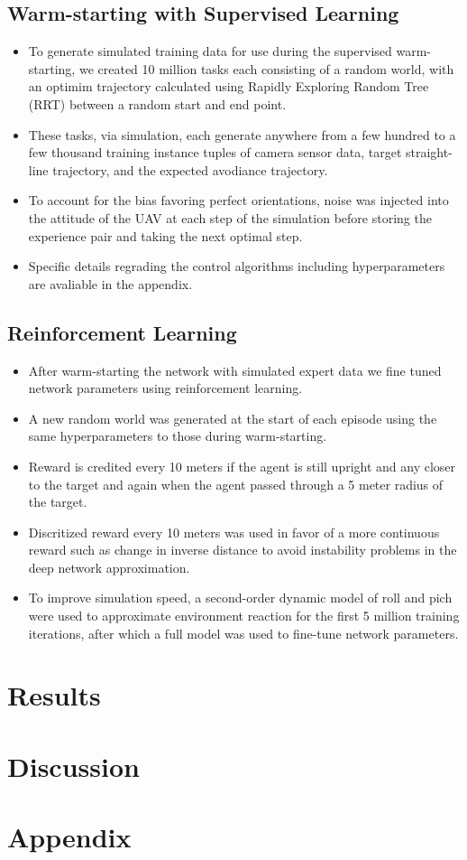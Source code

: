 \documentclass[paper=a4, fontsize=11pt]{scrartcl} %
\begin{document}
	\subsection{Warm-starting with Supervised Learning} 
	\begin{itemize}
		\item To generate simulated training data for use during the supervised warm-starting, we created 10 million tasks each consisting of a random world, with an optimim trajectory calculated using Rapidly Exploring Random Tree (RRT) between a random start and end point. 
		\item These tasks, via simulation, each generate anywhere from a few hundred to a few thousand training instance tuples of camera sensor data, target straight-line trajectory, and the expected avodiance trajectory. 
		\item To account for the bias favoring perfect orientations, noise was injected into the attitude of the UAV at each step of the simulation before storing the experience pair and taking the next optimal step. 
		\item Specific details regrading the control algorithms including hyperparameters are avaliable in the appendix.
	\end{itemize}

	\subsection{Reinforcement Learning} 
		\begin{itemize}
		\item After warm-starting the network with simulated expert data we fine tuned network parameters using reinforcement learning. 
		\item A new random world was generated at the start of each episode using the same hyperparameters to those during warm-starting. 
		\item Reward is credited every 10 meters if the agent is still upright and any closer to the target and again when the agent passed through a 5 meter radius of the target. 
		\item Discritized reward every 10 meters was used in favor of a more continuous reward such as change in inverse distance to avoid instability problems in the deep network approximation. 
		\item To improve simulation speed, a second-order dynamic model of roll and pich were used to approximate environment reaction for the first 5 million training iterations, after which a full model was used to fine-tune network parameters.
	\end{itemize}


\section{Results}

\section{Discussion}


\section{Appendix}




\end{document}
